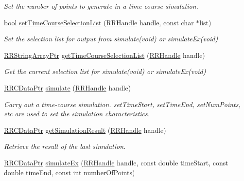 \begin{DoxyCompactItemize}
\begin{DoxyCompactList}\small\item\em Set the number of points to generate in a time course simulation. \end{DoxyCompactList}\item 
bool \hyperlink{group__simulation_gabc78e3202e85470f1c0e380a8988fc9e}{set\+Time\+Course\+Selection\+List} (\hyperlink{rrc__types_8h_a1d68f0592372208fa5a5f2799ea4b3ae}{R\+R\+Handle} handle, const char $\ast$list)
\begin{DoxyCompactList}\small\item\em Set the selection list for output from simulate(void) or simulate\+Ex(void) \end{DoxyCompactList}\item 
\hyperlink{rrc__types_8h_a7c9475df6c7337d99482b13a365e7596}{R\+R\+String\+Array\+Ptr} \hyperlink{group__simulation_ga4c2ce3bcc97cbd6a5dcae423dfeeba0c}{get\+Time\+Course\+Selection\+List} (\hyperlink{rrc__types_8h_a1d68f0592372208fa5a5f2799ea4b3ae}{R\+R\+Handle} handle)
\begin{DoxyCompactList}\small\item\em Get the current selection list for simulate(void) or simulate\+Ex(void) \end{DoxyCompactList}\item 
\hyperlink{rrc__types_8h_a9da8b124eb9c3c0045f8926c6a420b4a}{R\+R\+C\+Data\+Ptr} \hyperlink{group__simulation_ga55c9ef1913377542f61d1d622911cc7b}{simulate} (\hyperlink{rrc__types_8h_a1d68f0592372208fa5a5f2799ea4b3ae}{R\+R\+Handle} handle)
\begin{DoxyCompactList}\small\item\em Carry out a time-\/course simulation. set\+Time\+Start, set\+Time\+End, set\+Num\+Points, etc are used to set the simulation characteristics. \end{DoxyCompactList}\item 
\hyperlink{rrc__types_8h_a9da8b124eb9c3c0045f8926c6a420b4a}{R\+R\+C\+Data\+Ptr} \hyperlink{group__simulation_ga4c4bdc924e48c8e271e4654c6f40b3c8}{get\+Simulation\+Result} (\hyperlink{rrc__types_8h_a1d68f0592372208fa5a5f2799ea4b3ae}{R\+R\+Handle} handle)
\begin{DoxyCompactList}\small\item\em Retrieve the result of the last simulation. \end{DoxyCompactList}\item 
\hyperlink{rrc__types_8h_a9da8b124eb9c3c0045f8926c6a420b4a}{R\+R\+C\+Data\+Ptr} \hyperlink{group__simulation_gaa568722adbce33e145ce8c4a78146465}{simulate\+Ex} (\hyperlink{rrc__types_8h_a1d68f0592372208fa5a5f2799ea4b3ae}{R\+R\+Handle} handle, const double time\+Start, const double time\+End, const int number\+Of\+Points)

\end{DoxyCompactItemize}
